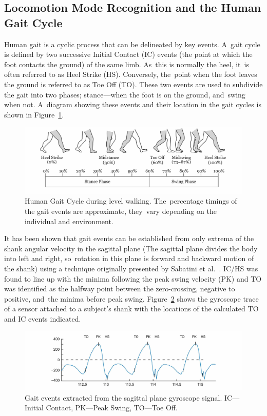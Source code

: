 \subsection{Locomotion Mode Recognition and the Human Gait Cycle}

Human gait is a cyclic process that can be delineated by key events. A~gait cycle is defined by two successive Initial Contact (IC) events (the point at which the foot contacts the ground) of the same limb. As~this is normally the heel, it~is often referred to as Heel Strike (HS). Conversely, the~point when the foot leaves the ground is referred to as Toe Off (TO). These two events are used to subdivide the gait into two phases; stance---when the foot is on the ground, and~swing when not. A~diagram showing these events and their location in the gait cycles is shown in Figure~\ref{fig:gait_cycle}.

\begin{figure}[!hbt]
    \centering
    \includegraphics[width=\textwidth]{content/4-LSTM_Behaviour/Gait_Cycle.jpg}
    \caption{Human Gait Cycle during level walking. The~percentage timings of the gait events are approximate, they~vary depending on the individual and environment.}
    \label{fig:gait_cycle}
\end{figure}

It has been shown that gait events can be established from only extrema of the shank angular velocity in the sagittal plane (The sagittal plane divides the body into left and right, so~rotation in this plane is forward and backward motion of the shank) using a technique originally presented by Sabatini et al.~\cite{Sabatini2005}. IC/HS was found to line up with the minima following the peak swing velocity (PK) and TO was identified as the halfway point between the zero-crossing, negative to positive, and~the minima before peak swing. \mbox{Figure~\ref{fig:y-gyro-hs-to}} shows the gyroscope trace of a sensor attached to a subject's shank with the locations of the calculated TO and IC events indicated.

\begin{figure}[!hbt]
    \centering
    \includegraphics[width=\textwidth]{content/4-LSTM_Behaviour/gyro_trace_hs.jpg}
    \caption{Gait events extracted
 from the sagittal plane gyroscope signal. IC---Initial Contact, PK---Peak Swing, TO---Toe Off.}
    \label{fig:y-gyro-hs-to}
\end{figure}

